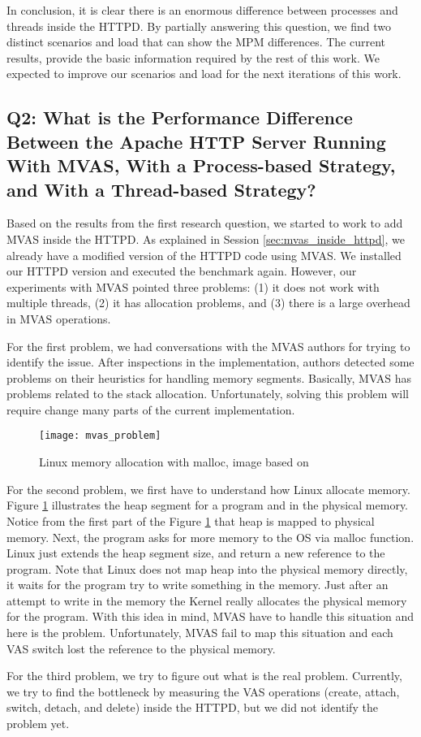 In conclusion, it is clear there is an enormous difference between processes
and threads inside the HTTPD. By partially answering this question, we find two
distinct scenarios and load that can show the MPM differences. The current
results, provide the basic information required by the rest of this work. We
expected to improve our scenarios and load for the next iterations of this
work.
 
\subsection{Q2: What is the Performance Difference Between the Apache HTTP Server Running With MVAS, With a Process-based Strategy, and With a Thread-based Strategy?}

Based on the results from the first research question, we started to work to
add MVAS inside the HTTPD. As explained in Session \ref{sec:mvas_inside_httpd},
we already have a modified version of the HTTPD code using MVAS. We installed
our HTTPD version and executed the benchmark again. However, our experiments
with MVAS pointed three problems: (1) it does not work with multiple threads,
(2) it has allocation problems, and (3) there is a large overhead in MVAS
operations.

For the first problem, we had conversations with the MVAS authors for trying to
identify the issue. After inspections in the implementation, authors detected
some problems on their heuristics for handling memory segments. Basically, MVAS
has problems related to the stack allocation. Unfortunately, solving this
problem will require change many parts of the current implementation.
 
\begin{figure}[!h]
  \centering
  \texttt{[image: mvas\_problem]}
  \caption{Linux memory allocation with malloc, image based on \cite{kernel_malloc}}
  \label{fig:malloc_linux}
\end{figure}
 
For the second problem, we first have to understand how Linux allocate memory.
Figure \ref{fig:malloc_linux} illustrates the heap segment for a program and in
the physical memory. Notice from the first part of the Figure
\ref{fig:malloc_linux} that heap is mapped to physical memory. Next, the
program asks for more memory to the OS via malloc function. Linux just extends
the heap segment size, and return a new reference to the program. Note that
Linux does not map heap into the physical memory directly, it waits for the
program try to write something in the memory. Just after an attempt to write in
the memory the Kernel really allocates the physical memory for the program.
With this idea in mind, MVAS have to handle this situation and here is the
problem. Unfortunately, MVAS fail to map this situation and each VAS switch
lost the reference to the physical memory.
 
For the third problem, we try to figure out what is the real problem.
Currently, we try to find the bottleneck by measuring the VAS operations
(create, attach, switch, detach, and delete) inside the HTTPD, but we did not
identify the problem yet.
